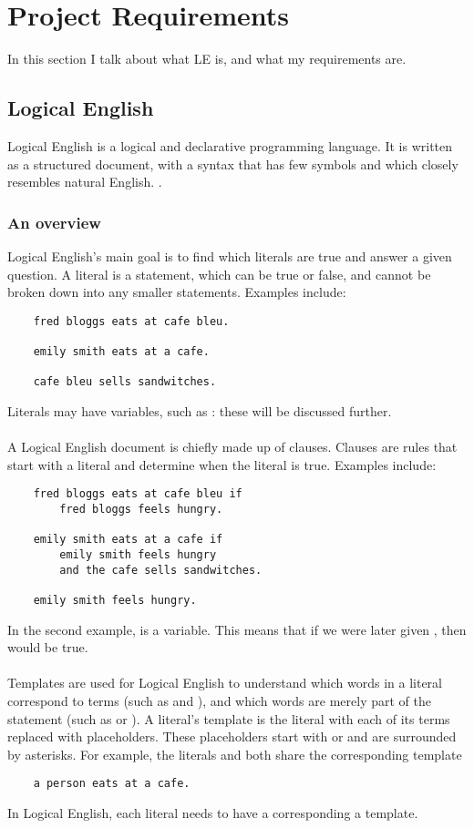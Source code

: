 \documentclass[../main.tex]{subfiles}
\begin{document}
\chapter{Project Requirements}
In this section I talk about what LE is, and what my requirements are.
\section{Logical English}
Logical English is a logical and declarative programming language. It is written as a structured document, with a syntax that has few symbols and which closely resembles natural English. \cite{logical_english}.

\subsection{An overview}
Logical English's main goal is to find which literals are true and answer a given question. A literal is a statement, which can be true or false, and cannot be broken down into any smaller statements. Examples include:
\begin{lstlisting}
    fred bloggs eats at cafe bleu.

    emily smith eats at a cafe.

    cafe bleu sells sandwitches.
\end{lstlisting}
Literals may have variables, such as : these will be discussed further.
\\ 
\\
A Logical English document is chiefly made up of clauses. Clauses are rules that start with a literal and determine when the literal is true. Examples include:
\begin{lstlisting}
    fred bloggs eats at cafe bleu if
        fred bloggs feels hungry.

    emily smith eats at a cafe if
        emily smith feels hungry
        and the cafe sells sandwitches.

    emily smith feels hungry.
\end{lstlisting}
In the second example,  is a variable. This means that if we were later given , then  would be true.
\\
\\
Templates are used for Logical English to understand which words in a literal correspond to terms (such as  and ), and which words are merely part of the statement (such as  or ). A literal's template is the literal with each of its terms replaced with placeholders. These placeholders start with  or  and are surrounded by asterisks. For example, the literals  and  both share the corresponding template
\begin{lstlisting}
    a person eats at a cafe.
\end{lstlisting} 
In Logical English, each literal needs to have a corresponding a template.
\end{document}
